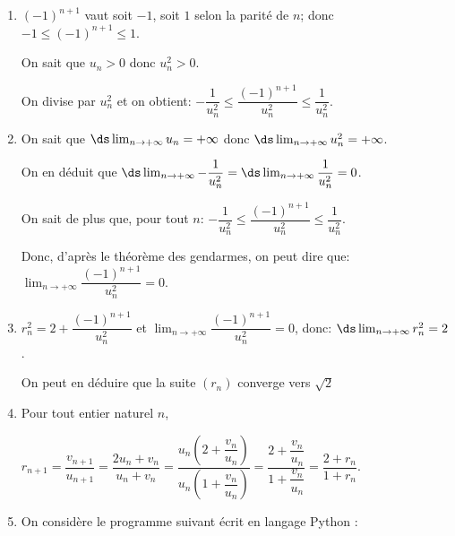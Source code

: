 \begin{enumerate}
	\begin{enumerate}
		\item %
$(-1)^{n+1}$ vaut soit $-1$, soit $1$ selon la parité de $n$; donc $-1\leqslant (-1)^{n+1} \leqslant 1$.

On sait que $u_n>0$ donc $u_n^2>0$.

On divise par $u_n^2$ et on obtient:
$- \dfrac{1}{u_n^2} \leqslant \dfrac{(- 1)^{n+1}}{u_n^2} \leqslant \dfrac{1}{u_n^2}.$

		\item%
On sait que $\ds\lim_{n\to +\infty} u_n=+\infty$ donc $\ds\lim_{n\to +\infty} u_n^2=+\infty$. 

On en déduit que $\ds\lim_{n\to +\infty} -\dfrac{1}{u_n^2} = \ds\lim_{n\to +\infty} \dfrac{1}{u_n^2} = 0$.

On sait de plus que, pour tout $n$:  $- \dfrac{1}{u_n^2} \leqslant \dfrac{(- 1)^{n+1}}{u_n^2} \leqslant \dfrac{1}{u_n^2}$.
		
Donc, d'après le théorème des gendarmes, on peut dire que:
$\displaystyle\lim_{n \to + \infty} \dfrac{(- 1)^{n+1}}{u_n^2}=0$.

		\item %
$r_n^2 = 2 + \dfrac{(- 1)^{n+1}}{u_n^2}$ et $\displaystyle\lim_{n \to + \infty} \dfrac{(- 1)^{n+1}}{u_n^2}=0$, donc: $\ds\lim_{n \to +\infty} r_n^2=2$.

On peut en déduire que la suite $(r_n)$ converge vers $\sqrt{2}$
		
		\item  Pour tout entier naturel $n$,
		
$r_{n+1}=\dfrac{v_{n+1}}{u_{n+1}} = \dfrac{2u_n + v_n}{u_n+v_n}
=\dfrac{u_n\left (2+\dfrac{v_n}{u_n}\right )}{u_n \left ( 1+\dfrac{v_n}{u_n}\right )}		
=\dfrac{2+\dfrac{v_n}{u_n}}{ 1+\dfrac{v_n}{u_n}}		
 = \dfrac{2 + r_n}{1 + r_n}$.

		\item On considère le programme suivant écrit en langage Python :
		
\begin{center}
\end{center}


\end{enumerate}
\end{enumerate}
